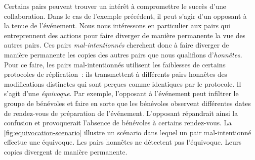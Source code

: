 Certains pairs peuvent trouver un intérêt à compromettre le succès d'une collaboration.
Dans le cas de l'exemple précédent, il peut s'agir d'un opposant à la tenue de l'événement.
Nous nous intéressons en particulier aux pairs qui entreprennent des actions pour faire diverger de manière permanente la vue des autres pairs.
Ces pairs \emph{mal-intentionnés} cherchent donc à faire diverger de manière permanente les copies des autres pairs que nous qualifions d'\emph{honnêtes}.
Pour ce faire, les pairs mal-intentionnés utilisent les faiblesses de certains protocoles de réplication~: ils transmettent à différents pairs honnêtes des modifications distinctes qui sont perçues comme identiques par le protocole.
Il s'agit d'une \emph{équivoque}.
Par exemple, l'opposant à l'événement peut infiltrer le groupe de bénévoles et faire en sorte que les bénévoles observent différentes dates de rendez-vous de préparation de l'événement.
L'opposant répandrait ainsi la confusion et provoquerait l'absence de bénévoles à certains rendez-vous.
La \autoref{fig:equivocation-scenario} illustre un scénario dans lequel un pair mal-intentionné effectue une équivoque.
Les pairs honnêtes ne détectent pas l'équivoque.
Leurs copies divergent de manière permanente.

